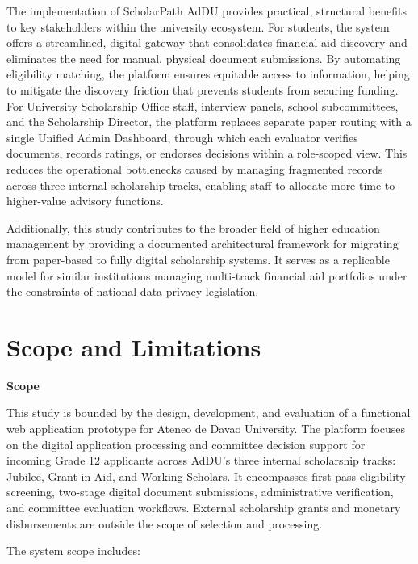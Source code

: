 The implementation of ScholarPath AdDU provides practical, structural benefits to key stakeholders within the university ecosystem. For students, the system offers a streamlined, digital gateway that consolidates financial aid discovery and eliminates the need for manual, physical document submissions. By automating eligibility matching, the platform ensures equitable access to information, helping to mitigate the discovery friction that prevents students from securing funding. For University Scholarship Office staff, interview panels, school subcommittees, and the Scholarship Director, the platform replaces separate paper routing with a single Unified Admin Dashboard, through which each evaluator verifies documents, records ratings, or endorses decisions within a role-scoped view. This reduces the operational bottlenecks caused by managing fragmented records across three internal scholarship tracks, enabling staff to allocate more time to higher-value advisory functions.

Additionally, this study contributes to the broader field of higher education management by providing a documented architectural framework for migrating from paper-based to fully digital scholarship systems. It serves as a replicable model for similar institutions managing multi-track financial aid portfolios under the constraints of national data privacy legislation.

\section{Scope and Limitations}

\textbf{Scope}

This study is bounded by the design, development, and evaluation of a functional web application prototype for Ateneo de Davao University. The platform focuses on the digital application processing and committee decision support for incoming Grade 12 applicants across AdDU's three internal scholarship tracks: Jubilee, Grant-in-Aid, and Working Scholars. It encompasses first-pass eligibility screening, two-stage digital document submissions, administrative verification, and committee evaluation workflows. External scholarship grants and monetary disbursements are outside the scope of selection and processing.

The system scope includes:


